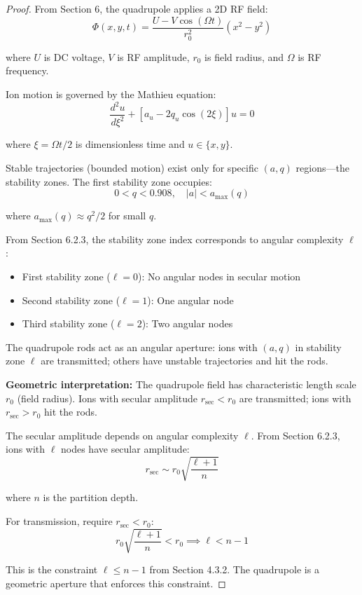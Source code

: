 \begin{proof}
From Section 6, the quadrupole applies a 2D RF field:
\begin{equation}
\Phi(x, y, t) = \frac{U - V\cos(\Omega t)}{r_0^2}(x^2 - y^2)
\end{equation}

where $U$ is DC voltage, $V$ is RF amplitude, $r_0$ is field radius, and $\Omega$ is RF frequency.

Ion motion is governed by the Mathieu equation:
\begin{equation}
\frac{d^2u}{d\xi^2} + [a_u - 2q_u\cos(2\xi)]u = 0
\end{equation}

where $\xi = \Omega t/2$ is dimensionless time and $u \in \{x, y\}$.

Stable trajectories (bounded motion) exist only for specific $(a, q)$ regions—the stability zones. The first stability zone occupies:
\begin{equation}
0 < q < 0.908, \quad |a| < a_{\max}(q)
\end{equation}

where $a_{\max}(q) \approx q^2/2$ for small $q$.

From Section 6.2.3, the stability zone index corresponds to angular complexity $\ell$:
\begin{itemize}
    \item First stability zone ($\ell = 0$): No angular nodes in secular motion
    \item Second stability zone ($\ell = 1$): One angular node
    \item Third stability zone ($\ell = 2$): Two angular nodes
\end{itemize}

The quadrupole rods act as an angular aperture: ions with $(a, q)$ in stability zone $\ell$ are transmitted; others have unstable trajectories and hit the rods.

\textbf{Geometric interpretation:} The quadrupole field has characteristic length scale $r_0$ (field radius). Ions with secular amplitude $r_{\text{sec}} < r_0$ are transmitted; ions with $r_{\text{sec}} > r_0$ hit the rods.

The secular amplitude depends on angular complexity $\ell$. From Section 6.2.3, ions with $\ell$ nodes have secular amplitude:
\begin{equation}
r_{\text{sec}} \sim r_0 \sqrt{\frac{\ell + 1}{n}}
\end{equation}

where $n$ is the partition depth.

For transmission, require $r_{\text{sec}} < r_0$:
\begin{equation}
r_0 \sqrt{\frac{\ell + 1}{n}} < r_0 \implies \ell < n - 1
\end{equation}

This is the constraint $\ell \leq n-1$ from Section 4.3.2. The quadrupole is a geometric aperture that enforces this constraint.
\end{proof}

